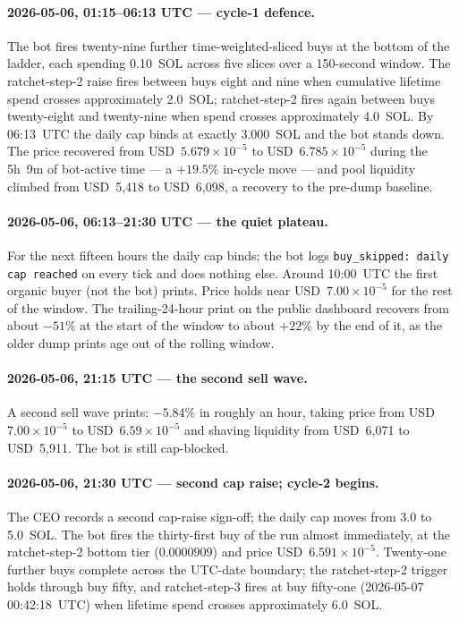 \documentclass[11pt,a4paper]{article}
\begin{document}
\paragraph{2026-05-06, 01:15--06:13 UTC --- cycle-1 defence.} The bot fires
twenty-nine further time-weighted-sliced buys at the bottom of the ladder, each
spending 0.10~SOL across five slices over a 150-second window. The
ratchet-step-2 raise fires between buys eight and nine when cumulative lifetime
spend crosses approximately 2.0~SOL; ratchet-step-2 fires again between buys
twenty-eight and twenty-nine when spend crosses approximately 4.0~SOL. By
06:13~UTC the daily cap binds at exactly 3.000~SOL and the bot stands down. The
price recovered from USD~$5.679\!\times\!10^{-5}$ to
USD~$6.785\!\times\!10^{-5}$ during the 5h~9m of bot-active time --- a $+19.5\%$
in-cycle move --- and pool liquidity climbed from USD~5{,}418 to USD~6{,}098, a
recovery to the pre-dump baseline.

\paragraph{2026-05-06, 06:13--21:30 UTC --- the quiet plateau.} For the next
fifteen hours the daily cap binds; the bot logs \texttt{buy\_skipped: daily cap
reached} on every tick and does nothing else. Around 10:00~UTC the first
organic buyer (not the bot) prints. Price holds near
USD~$7.00\!\times\!10^{-5}$ for the rest of the window. The trailing-24-hour
print on the public dashboard recovers from about $-51\%$ at the start of the
window to about $+22\%$ by the end of it, as the older dump prints age out of
the rolling window.

\paragraph{2026-05-06, 21:15 UTC --- the second sell wave.} A second sell wave
prints: $-5.84\%$ in roughly an hour, taking price from
USD~$7.00\!\times\!10^{-5}$ to USD~$6.59\!\times\!10^{-5}$ and shaving liquidity
from USD~6{,}071 to USD~5{,}911. The bot is still cap-blocked.

\paragraph{2026-05-06, 21:30 UTC --- second cap raise; cycle-2 begins.} The
CEO records a second cap-raise sign-off; the daily cap moves from 3.0 to
5.0~SOL. The bot fires the thirty-first buy of the run almost immediately, at
the ratchet-step-2 bottom tier ($0.0000909$) and price
USD~$6.591\!\times\!10^{-5}$. Twenty-one further buys complete across the
UTC-date boundary; the ratchet-step-2 trigger holds through buy fifty, and
ratchet-step-3 fires at buy fifty-one (2026-05-07 00:42:18~UTC) when lifetime
spend crosses approximately 6.0~SOL.
\end{document}
